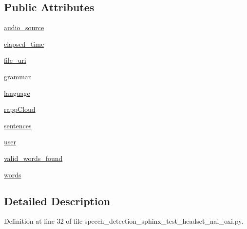 \subsection*{Public Attributes}
\begin{DoxyCompactItemize}
\item 
\hyperlink{classspeech__detection__sphinx__test__headset__nai__oxi_1_1RappInterfaceTest_a2df10b83780b58b8257cd86f10fac878}{audio\-\_\-source}
\item 
\hyperlink{classspeech__detection__sphinx__test__headset__nai__oxi_1_1RappInterfaceTest_a03824b184a2b8ab90a3c0e3e20ead5f0}{elapsed\-\_\-time}
\item 
\hyperlink{classspeech__detection__sphinx__test__headset__nai__oxi_1_1RappInterfaceTest_a5cc7fc98363103ddf448811c81666db4}{file\-\_\-uri}
\item 
\hyperlink{classspeech__detection__sphinx__test__headset__nai__oxi_1_1RappInterfaceTest_a472cf24d77f1f9b46baf7bb0c01faf75}{grammar}
\item 
\hyperlink{classspeech__detection__sphinx__test__headset__nai__oxi_1_1RappInterfaceTest_a3ef0a29e05e2c0506e2b425feeda28a7}{language}
\item 
\hyperlink{classspeech__detection__sphinx__test__headset__nai__oxi_1_1RappInterfaceTest_abde9daa2ebf204ad89c39e03eb7fbc72}{rapp\-Cloud}
\item 
\hyperlink{classspeech__detection__sphinx__test__headset__nai__oxi_1_1RappInterfaceTest_ab09ba43fdedd96f9065b57e843a79f61}{sentences}
\item 
\hyperlink{classspeech__detection__sphinx__test__headset__nai__oxi_1_1RappInterfaceTest_a46c29c3bec006a6eb7096d4065528473}{user}
\item 
\hyperlink{classspeech__detection__sphinx__test__headset__nai__oxi_1_1RappInterfaceTest_aee3dc85dce3c5ffaa6b890074d59ddcf}{valid\-\_\-words\-\_\-found}
\item 
\hyperlink{classspeech__detection__sphinx__test__headset__nai__oxi_1_1RappInterfaceTest_a3b6649e75cca230249f320b12bd81313}{words}
\end{DoxyCompactItemize}


\subsection{Detailed Description}


Definition at line 32 of file speech\-\_\-detection\-\_\-sphinx\-\_\-test\-\_\-headset\-\_\-nai\-\_\-oxi.\-py.



